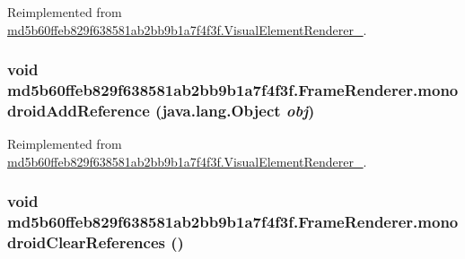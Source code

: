 Reimplemented from \hyperlink{classmd5b60ffeb829f638581ab2bb9b1a7f4f3f_1_1_visual_element_renderer__1_3ae26bd8575212fb6d6f14487b4f48d4}{md5b60ffeb829f638581ab2bb9b1a7f4f3f.VisualElementRenderer\_}.\hypertarget{classmd5b60ffeb829f638581ab2bb9b1a7f4f3f_1_1_frame_renderer_2178330cfbb272c1b56a10b5cc406576}{
\subsubsection[{monodroidAddReference}]{\setlength{\rightskip}{0pt plus 5cm}void md5b60ffeb829f638581ab2bb9b1a7f4f3f.FrameRenderer.monodroidAddReference (java.lang.Object {\em obj})}}
\label{classmd5b60ffeb829f638581ab2bb9b1a7f4f3f_1_1_frame_renderer_2178330cfbb272c1b56a10b5cc406576}




Reimplemented from \hyperlink{classmd5b60ffeb829f638581ab2bb9b1a7f4f3f_1_1_visual_element_renderer__1_321b2967faff34b0f7971f55915f583e}{md5b60ffeb829f638581ab2bb9b1a7f4f3f.VisualElementRenderer\_}.\hypertarget{classmd5b60ffeb829f638581ab2bb9b1a7f4f3f_1_1_frame_renderer_9122665ff96453c943de70afacc24f32}{
\subsubsection[{monodroidClearReferences}]{\setlength{\rightskip}{0pt plus 5cm}void md5b60ffeb829f638581ab2bb9b1a7f4f3f.FrameRenderer.monodroidClearReferences ()}}
\label{classmd5b60ffeb829f638581ab2bb9b1a7f4f3f_1_1_frame_renderer_9122665ff96453c943de70afacc24f32}




